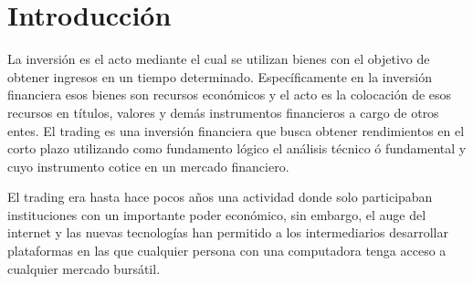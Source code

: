 \documentclass[a4paper,12pt]{Latex/Classes/PhDthesisPSnPDF}
\begin{document}
\tableofcontents
\listoffigures
\listoftables



\chapter*{Introducción}

La inversión es el acto mediante el cual se utilizan bienes con el objetivo de obtener ingresos en un tiempo determinado. Específicamente en la inversión financiera esos bienes son recursos económicos y el acto es la colocación de esos recursos en títulos, valores y demás instrumentos financieros a cargo de otros entes. El trading es una inversión financiera que busca obtener rendimientos en el corto plazo utilizando como fundamento lógico el análisis técnico ó fundamental y cuyo instrumento cotice en un mercado financiero. 

El trading era hasta hace pocos años una actividad donde solo participaban instituciones con un importante poder económico, sin embargo, el auge del internet y las nuevas tecnologías han permitido a los intermediarios desarrollar plataformas en las que cualquier persona con una computadora tenga acceso a cualquier mercado bursátil.


\end{document}
